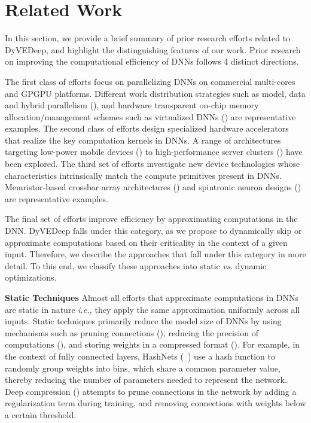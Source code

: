 \documentclass{article} %
\begin{document}
\section{Related Work} \label{sec:relwork}

In this section, we provide a brief summary of prior research efforts related to DyVEDeep, and highlight the distinguishing features of our work. Prior research on improving the computational efficiency of DNNs follows 4 distinct directions. 

The first class of efforts focus on parallelizing DNNs on commercial multi-cores and GPGPU platforms. Different work distribution strategies such as model, data and hybrid parallelism (\cite{DBLP:journals/corr/Krizhevsky14,DBLP:journals/corr/0002AMVSKKD16}), and hardware transparent on-chip memory allocation/management schemes such as virtualized DNNs (\cite{DBLP:journals/corr/RhuGCZK16}) are representative examples. The second class of efforts design specialized hardware accelerators that realize the key computation kernels in DNNs. A range of architectures targeting low-power mobile devices (\cite{5981829}) to high-performance server clusters (\cite{Chen:2014:DMS:2742155.2742217,TPU}) have been explored. The third set of efforts investigate new device technologies whose characteristics intrinsically match the compute primitives present in DNNs. Memristor-based crossbar array architectures (\cite{Liu:2015:RHR:2744769.2744900}) and spintronic neuron designs (\cite{Ramasubramanian:2014:SSD:2627369.2627625}) are representative examples.

The final set of efforts improve efficiency by approximating computations in the DNN. DyVEDeep falls under this category, as we propose to dynamically skip or approximate computations based on their criticality in the context of a given input. Therefore, we describe the approaches that fall under this category in more detail. To this end, we classify these approaches into static \emph{vs.} dynamic optimizations.

{\bf \noindent Static Techniques} Almost all efforts that approximate computations in DNNs are static in nature \emph{i.e.,} they apply the same approximation uniformly across all inputs. Static techniques primarily reduce the model size of DNNs by using mechanisms such as pruning connections (\cite{DBLP:conf/nips/CunDS89,DBLP:journals/corr/HanPTD15,DBLP:conf/interspeech/LiuZW14}), reducing the precision of computations (\cite{Venkataramani:2014:AEN:2627369.2627613,DBLP:conf/icassp/AnwarHS15}), and storing weights in a compressed format (\cite{DBLP:journals/corr/HanMD15}). For example, in the context of fully connected layers, HashNets (~\cite{DBLP:journals/corr/ChenWTWC15}) use a hash function to randomly group weights into bins, which share a common parameter value, thereby reducing the number of parameters needed to represent the network. Deep compression (\cite{DBLP:journals/corr/HanMD15}) attempts to prune connections in the network by adding a regularization term during training, and removing connections with weights below a certain threshold. 
\end{document}
